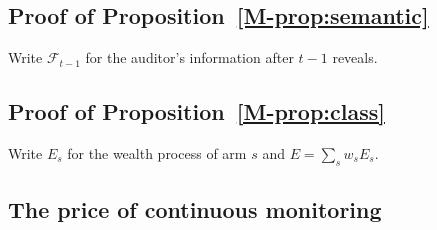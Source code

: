 \documentclass[journal]{IEEEtran}
\theoremstyle{definition}
\theoremstyle{remark}
\newcommand{\F}{\mathcal{F}}
\begin{document}
\subsection{Proof of Proposition~\ref{M-prop:semantic}}

Write $\F_{t-1}$ for the auditor's information after $t-1$ reveals.


\subsection{Proof of Proposition~\ref{M-prop:class}}

Write $E_s$ for the wealth process of arm $s$ and $E=\sum_sw_sE_s$.


\subsection{The price of continuous monitoring}


\end{document}
